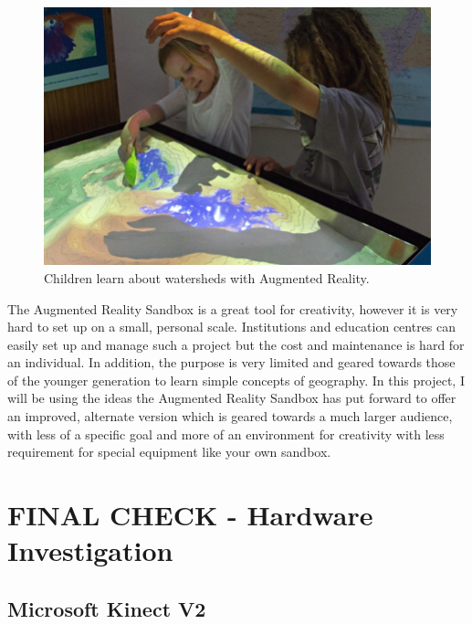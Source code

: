 \documentclass[11pt]{article}
\begin{document}
\begin{figure}[!h]
	\centering
	\includegraphics[scale=0.8]{pics/sandbox.jpg}
	\caption{Children learn about watersheds with Augmented Reality.}
	\label{arsandbox}
\end{figure}

The Augmented Reality Sandbox is a great tool for creativity, however it is very hard to set up
on a small, personal scale. Institutions and education centres can easily set
up and manage such a project but the cost and maintenance is hard for an
individual. In addition, the purpose is very limited and geared towards those
of the younger generation to learn simple concepts of geography. In this project,
I will be using the ideas the Augmented Reality Sandbox has put forward to offer an
improved, alternate version which is geared towards a much larger audience, with
less of a specific goal and more of an environment for creativity with less
requirement for special equipment like your own sandbox.

\section{FINAL CHECK - Hardware Investigation}
\subsection{Microsoft Kinect V2}
\end{document}
